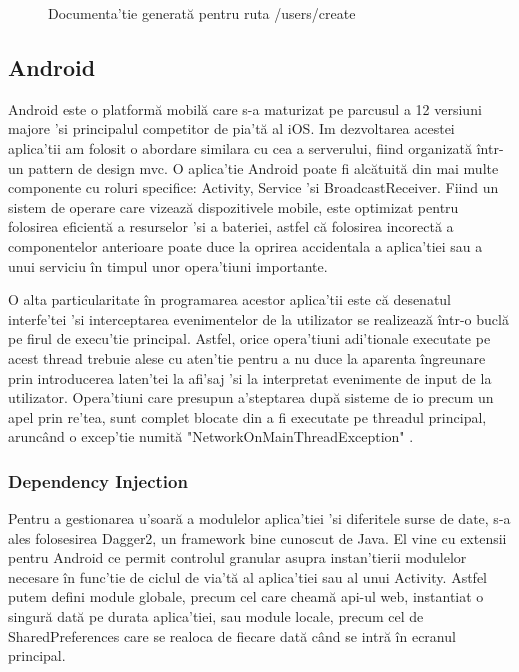 \begin{figure}[H]
  \centering
  \caption{Documenta'tie generată pentru ruta /users/create}
\end{figure}

\subsection {Android}

Android este o platformă mobilă care s-a maturizat pe parcusul a 12 versiuni majore 'si principalul competitor de pia'tă al iOS. Im dezvoltarea acestei aplica'tii am folosit o abordare similara cu cea a serverului, fiind organizată într-un pattern de design \acrshort{mvc}. O aplica'tie Android poate fi alcătuită din mai multe componente cu roluri specifice: Activity, Service 'si BroadcastReceiver. Fiind un sistem de operare care vizează dispozitivele mobile, este optimizat pentru folosirea eficientă a resurselor 'si a bateriei, astfel că folosirea incorectă a componentelor anterioare poate duce la oprirea accidentala a aplica'tiei sau a unui serviciu în timpul unor opera'tiuni importante.

O alta particularitate în programarea acestor aplica'tii este că desenatul interfe'tei 'si interceptarea evenimentelor de la utilizator se realizează într-o buclă pe firul de execu'tie principal. Astfel, orice opera'tiuni adi'tionale executate pe acest thread trebuie alese cu aten'tie pentru a nu duce la aparenta îngreunare prin introducerea laten'tei la afi'saj 'si la interpretat evenimente de input de la utilizator. Opera'tiuni care presupun a'steptarea după sisteme de \acrshort{io} precum un apel prin re'tea, sunt complet blocate din a fi executate pe threadul principal, aruncând o excep'tie numită "NetworkOnMainThreadException" \cite{AndroidNetwork2022}.

\subsubsection {Dependency Injection}

Pentru a gestionarea u'soară a modulelor aplica'tiei 'si diferitele surse de date, s-a ales folosesirea Dagger2, un framework bine cunoscut de Java. El vine cu extensii pentru Android ce permit controlul granular asupra instan'tierii modulelor necesare în func'tie de ciclul de via'tă al aplica'tiei sau al unui Activity. Astfel putem defini module globale, precum cel care cheamă api-ul web, instantiat o singură dată pe durata aplica'tiei, sau module locale, precum cel de SharedPreferences care se realoca de fiecare dată când se intră în ecranul principal.

